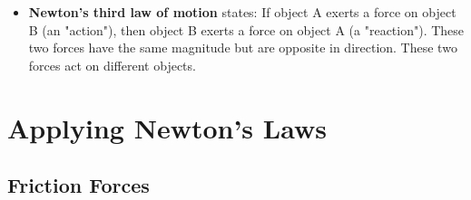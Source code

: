 \documentclass{article}
\begin{document}
\begin{itemize}
    \item \textbf{Newton's third law of motion} states: If object A exerts a force on object B (an "action"), then object B exerts a force on object A (a "reaction"). These two forces have the same magnitude but are opposite in direction. These two forces act on different objects.
\end{itemize}

\section{Applying Newton's Laws}

\setcounter{subsection}{2}
\subsection{Friction Forces}
\end{document}
